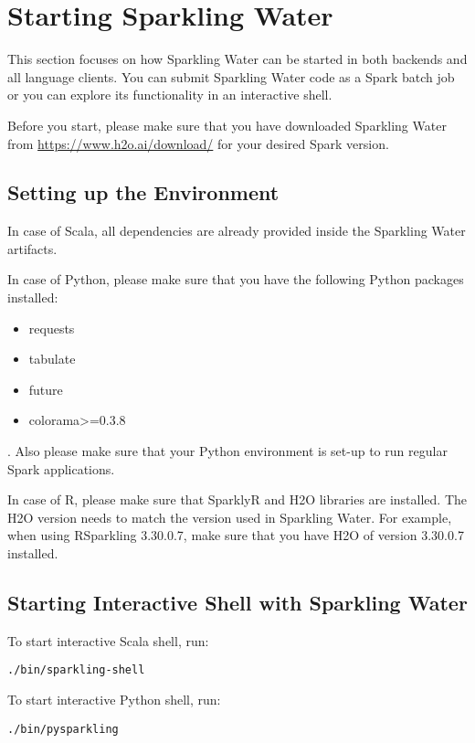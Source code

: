 \section{Starting Sparkling Water}

This section focuses on how Sparkling Water can be started in both backends and all language clients.
You can submit Sparkling Water code as a Spark batch job or you can explore its functionality in an interactive shell.

Before you start, please make sure that you have downloaded Sparkling Water from \url{https://www.h2o.ai/download/} for
your desired Spark version.

\subsection{Setting up the Environment}

In case of Scala, all dependencies are already provided inside the Sparkling Water artifacts.

In case of Python, please make sure that you have the following Python packages installed:
\begin{itemize}
    \item requests
    \item tabulate
    \item future
    \item colorama\textgreater=0.3.8
\end{itemize}.
Also please make sure that your Python environment is set-up to run regular Spark applications.

In case of R, please make sure that SparklyR and H2O libraries are installed. The H2O version needs to match the version
used in Sparkling Water. For example, when using RSparkling 3.30.0.7, make sure that you have H2O of version 3.30.0.7 installed.

\subsection{Starting Interactive Shell with Sparkling Water}

To start interactive Scala shell, run:

\begin{lstlisting}[style=bash]
./bin/sparkling-shell
\end{lstlisting}

To start interactive Python shell, run:

\begin{lstlisting}[style=bash]
./bin/pysparkling
\end{lstlisting}

